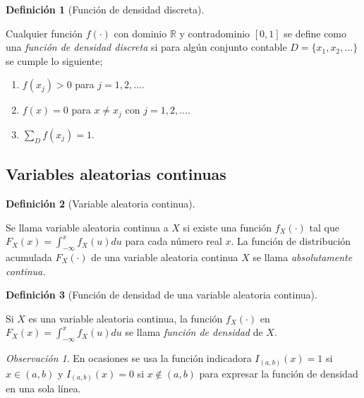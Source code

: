 \documentclass[
  us-letterpaper,
]{scrreprt}
\theoremstyle{plain}
\theoremstyle{definition}
\newtheorem{definition}{Definición}[chapter]
\theoremstyle{definition}
\theoremstyle{plain}
\theoremstyle{remark}
\newtheorem*{remark}{Observación}
\begin{document}
\begin{definition}[Función de densidad
discreta]\protect\hypertarget{def-ddf}{}\label{def-ddf}

Cualquier función \(f(\cdot)\) con dominio \(\mathbb R\) y contradominio
\([0,1]\) se define como una \emph{función de densidad discreta} si para
algún conjunto contable \(D=\{x_1, x_2,\ldots\}\) se cumple lo
siguiente;

\begin{enumerate}
\def\labelenumi{\roman{enumi}.}
\item
  \(f(x_j)>0\) para \(j=1,2,\ldots.\)
\item
  \(f(x)=0\) para \(x\neq x_j\) con \(j=1,2,\ldots.\)
\item
  \(\sum_D f(x_j)=1\).
\end{enumerate}

\end{definition}

\subsection{Variables aleatorias
continuas}\label{variables-aleatorias-continuas}

\begin{definition}[Variable aleatoria
continua]\protect\hypertarget{def-vac}{}\label{def-vac}

Se llama variable aleatoria continua a \(X\) si existe una función
\(f_X(\cdot)\) tal que \(F_X(x)=\int_{-\infty}^x f_X(u) du\) para cada
número real \(x\). La función de distribución acumulada \(F_X(\cdot)\)
de una variable aleatoria continua \(X\) se llama \emph{absolutamente
continua.}

\end{definition}

\begin{definition}[Función de densidad de una variable aleatoria
continua]\protect\hypertarget{def-pfdvac}{}\label{def-pfdvac}

Si \(X\) es una variable aleatoria continua, la función \(f_X(\cdot)\)
en \(F_X(x)=\int_{-\infty}^x f_X(u)du\) se llama \emph{función de
densidad} de \(X\).

\end{definition}

\begin{remark}
En ocasiones se usa la función indicadora \(I_{(a,b)}(x)=1\) si
\(x\in (a,b)\) y \(I_{(a,b)}(x)=0\) si \(x\notin (a,b)\) para expresar
la función de densidad en una sola línea.
\end{remark}
\end{document}
